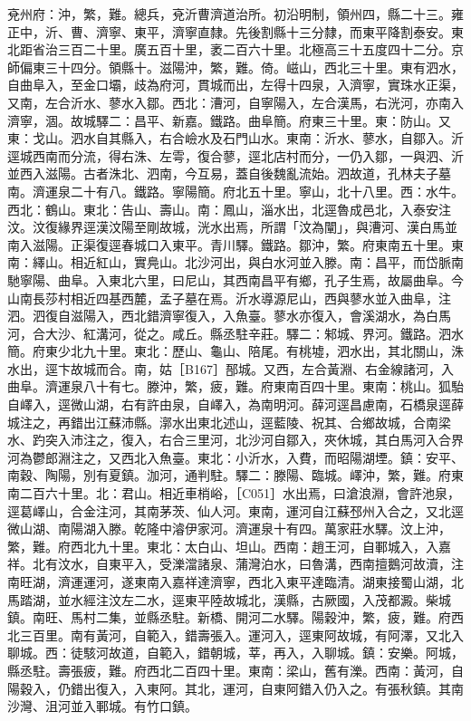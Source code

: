 \begin{pinyinscope}
兗州府：沖，繁，難。總兵，兗沂曹濟道治所。初沿明制，領州四，縣二十三。雍正中，沂、曹、濟寧、東平，濟寧直隸。先後割縣十三分隸，而東平降割泰安。東北距省治三百二十里。廣五百十里，袤二百六十里。北極高三十五度四十二分。京師偏東三十四分。領縣十。滋陽沖，繁，難。倚。嵫山，西北三十里。東有泗水，自曲阜入，至金口壩，歧為府河，貫城而出，左得十四泉，入濟寧，實珠水正渠，又南，左合沂水、蓼水入鄒。西北：漕河，自寧陽入，左合漢馬，右洸河，亦南入濟寧，涸。故城驛二：昌平、新嘉。鐵路。曲阜簡。府東三十里。東：防山。又東：戈山。泗水自其縣入，右合嶮水及石門山水。東南：沂水、蓼水，自鄒入。沂逕城西南而分流，得右洙、左雩，復合蓼，逕北店村而分，一仍入鄒，一與泗、沂並西入滋陽。古者洙北、泗南，今互易，蓋自後魏亂流始。泗故道，孔林夫子墓南。濟運泉二十有八。鐵路。寧陽簡。府北五十里。寧山，北十八里。西：水牛。西北：鶴山。東北：告山、壽山。南：鳳山，淄水出，北逕魯成邑北，入泰安注汶。汶復緣界逕漢汶陽至剛故城，洸水出焉，所謂「汶為闡」，與漕河、漢白馬並南入滋陽。正渠復逕春城口入東平。青川驛。鐵路。鄒沖，繁。府東南五十里。東南：繹山。相近紅山，實鳧山。北沙河出，與白水河並入滕。南：昌平，而岱脈南馳寧陽、曲阜。入東北六里，曰尼山，其西南昌平有鄉，孔子生焉，故屬曲阜。今山南長莎村相近四基西麓，孟子墓在焉。沂水導源尼山，西與蓼水並入曲阜，注泗。泗復自滋陽入，西北錯濟寧復入，入魚臺。蓼水亦復入，會溪湖水，為白馬河，合大沙、紅溝河，從之。咸丘。縣丞駐辛莊。驛二：邾城、界河。鐵路。泗水簡。府東少北九十里。東北：歷山、龜山、陪尾。有桃墟，泗水出，其北關山，洙水出，逕卞故城而合。南，姑［B167］郚城。又西，左合黃淵、右金線諸河，入曲阜。濟運泉八十有七。滕沖，繁，疲，難。府東南百四十里。東南：桃山。狐駘自嶧入，逕微山湖，右有許由泉，自嶧入，為南明河。薛河逕昌慮南，石橋泉逕薛城注之，再錯出江蘇沛縣。漷水出東北述山，逕藍陵、祝其、合鄉故城，合南梁水、趵突入沛注之，復入，右合三里河，北沙河自鄒入，夾休城，其白馬河入合界河為鬱郎淵注之，又西北入魚臺。東北：小沂水，入費，而昭陽湖堙。鎮：安平、南穀、陶陽，別有夏鎮。泇河，通判駐。驛二：滕陽、臨城。嶧沖，繁，難。府東南二百六十里。北：君山。相近車梢峪，［C051］水出焉，曰滄浪淵，會許池泉，逕葛嶧山，合金注河，其南茅茨、仙人河。東南，運河自江蘇邳州入合之，又北逕微山湖、南陽湖入滕。乾隆中濬伊家河。濟運泉十有四。萬家莊水驛。汶上沖，繁，難。府西北九十里。東北：太白山、坦山。西南：趙王河，自鄆城入，入嘉祥。北有汶水，自東平入，受濼澢諸泉、蒲灣泊水，曰魯溝，西南擅鵝河故瀆，注南旺湖，濟運運河，遂東南入嘉祥達濟寧，西北入東平達臨清。湖東接蜀山湖，北馬踏湖，並水經注汶左二水，逕東平陸故城北，漢縣，古厥國，入茂都澱。柴城鎮。南旺、馬村二集，並縣丞駐。新橋、開河二水驛。陽穀沖，繁，疲，難。府西北三百里。南有黃河，自範入，錯壽張入。運河入，逕東阿故城，有阿澤，又北入聊城。西：徒駭河故道，自範入，錯朝城，莘，再入，入聊城。鎮：安樂。阿城，縣丞駐。壽張疲，難。府西北二百四十里。東南：梁山，舊有濼。西南：黃河，自陽穀入，仍錯出復入，入東阿。其北，運河，自東阿錯入仍入之。有張秋鎮。其南沙灣、沮河並入鄆城。有竹口鎮。


\end{pinyinscope}

